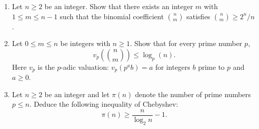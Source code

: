 \begin{exercise}
\label{algebra:2018:7}
\begin{enumerate}
    \item Let $n \geq 2$ be an integer. Show that there exists an integer $m$ with $1 \leq m \leq n - 1$ such that the binomial coefficient $\binom{n}{m}$ satisfies $\binom{n}{m} \geq 2^n/n$.
    \item Let $0 \leq m \leq n$ be integers with $n \geq 1$. Show that for every prime number $p$,
    \[
    v_p\left(\binom{n}{m}\right) \leq \log_p(n).
    \]
    Here $v_p$ is the $p$-adic valuation: $v_p(p^a b) = a$ for integers $b$ prime to $p$ and $a \geq 0$.
    \item Let $n \geq 2$ be an integer and let $\pi(n)$ denote the number of prime numbers $p \leq n$. Deduce the following inequality of Chebyshev:
    \[
    \pi(n) \geq \frac{n}{\log_2 n} - 1.
    \]
\end{enumerate}
\end{exercise}
